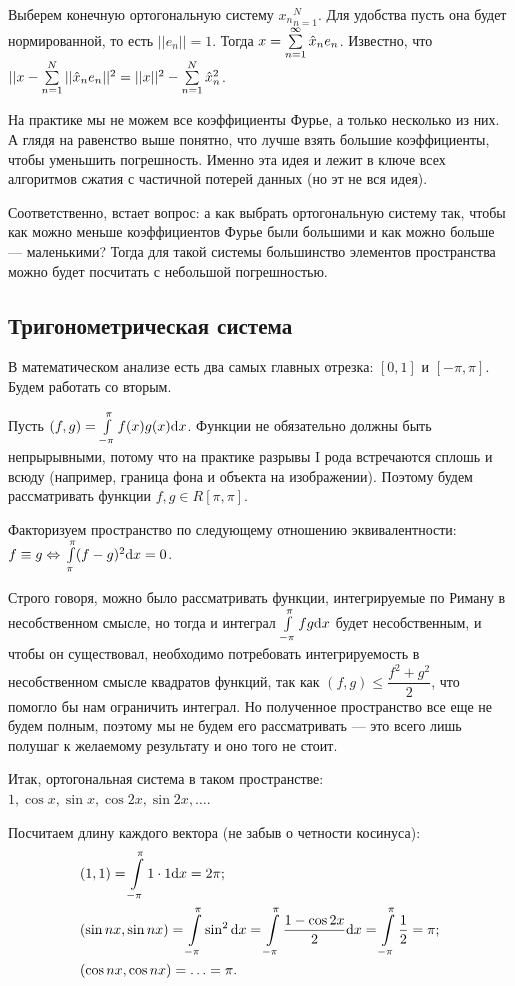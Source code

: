\documentclass[a4paper, 12pt]{article}
\begin{document}
Выберем конечную ортогональную систему ${x_n}_{n=1}^N$. Для удобства пусть она будет нормированной, то есть $||e_n|| = 1$. Тогда $x = \sum\limits_{n=1}^{\infty} \hat{x}_ne_n$. Известно, что $||x - \sum\limits_{n=1}^{N}||\hat{x}_ne_n||^2 = ||x||^2 - \sum\limits_{n=1}^{N}\hat{x}_n^2$.

На практике мы не можем все коэффициенты Фурье, а только несколько из них. А глядя на равенство выше понятно, что лучше взять большие коэффициенты, чтобы уменьшить погрешность. Именно эта идея и лежит в ключе всех алгоритмов сжатия с частичной потерей данных (но эт не вся идея).

Соответственно, встает вопрос: а как выбрать ортогональную систему так, чтобы как можно меньше коэффициентов Фурье были большими и как можно больше --- маленькими? Тогда для такой системы большинство элементов пространства можно будет посчитать с небольшой погрешностью.

\subsection{Тригонометрическая система}
В математическом анализе есть два самых главных отрезка: $[0, 1]$ и $[-\pi, \pi]$. Будем работать со вторым.

Пусть $(f, g) = \int\limits_{-\pi}^{\pi} f(x)g(x) \mathrm{d} x$. Функции не обязательно должны быть непрырывными, потому что на практике разрывы I рода встречаются сплошь и всюду (например, граница фона и объекта на изображении). Поэтому будем рассматривать функции $f, g \in R[\pi, \pi]$.

Факторизуем пространство по следующему отношению эквивалентности: $f \equiv g \Leftrightarrow \\\int\limits_{\pi}^{\pi}(f - g)^2 \mathrm{d} x = 0$. 

Строго говоря, можно было рассматривать функции, интегрируемые по Риману в несобственном смысле, но тогда и интеграл $\int\limits_{-\pi}^{\pi}fg \mathrm{d} x$ будет несобственным, и чтобы он существовал, необходимо потребовать интегрируемость в несобственном смысле квадратов функций, так как $(f, g) \leq \dfrac{f^2 + g^2}{2}$, что помогло бы нам ограничить интеграл. Но полученное пространство все еще не будем полным, поэтому мы не будем его рассматривать --- это всего лишь полушаг к желаемому результату и оно того не стоит.

Итак, ортогональная система в таком пространстве: $1, \cos x, \sin x, \cos 2x, \sin 2x, \ldots$.

Посчитаем длину каждого вектора (не забыв о четности косинуса):
\begin{align*}
&(1, 1) =  \int\limits_{-\pi}^{\pi} 1 \cdot 1 \mathrm{d} x = 2\pi;\\
&(\sin nx, \sin nx) =  \int\limits_{-\pi}^{\pi} \sin^2 \mathrm{d} x =  \int\limits_{-\pi}^{\pi} \frac{1 - \cos 2x}{2} \mathrm{d} x =  \int\limits_{-\pi}^{\pi} \dfrac{1}{2} = \pi;\\
&(\cos nx, \cos nx) = \ldots = \pi.
\end{align*}
\end{document}
